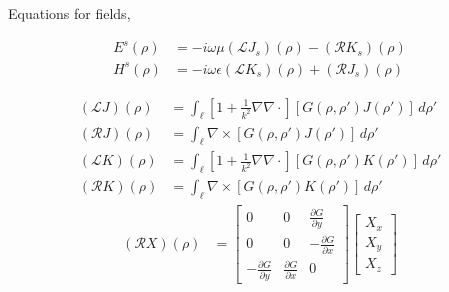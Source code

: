 \documentclass{article}
\newcommand{\0}{\varnothing}
\begin{document}
Equations for fields,

\begin{align*}
    E^s(\rho) &= -i\omega\mu(\mathcal{L}J_s)(\rho) - (\mathcal{R}K_s)(\rho)\\
    H^s(\rho) &= -i\omega\epsilon(\mathcal{L}K_s)(\rho) + (\mathcal{R}J_s)(\rho)
\end{align*}

\begin{align*}
    (\mathcal{L}J)(\rho) &= \int_{\ell}[1+\frac{1}{k^2}\nabla\nabla\cdotp] [G(\rho,\rho')J(\rho')] \,d\rho'\\
    (\mathcal{R}J)(\rho) &= \int_{\ell}\nabla \times [G(\rho,\rho')J(\rho')] \,d\rho'\\
    (\mathcal{L}K)(\rho) &= \int_{\ell}[1+\frac{1}{k^2}\nabla\nabla\cdotp] [G(\rho,\rho')K(\rho')] \,d\rho'\\
    (\mathcal{R}K)(\rho) &= \int_{\ell}\nabla \times [G(\rho,\rho')K(\rho')] \,d\rho'
\end{align*}
\begin{align*}
    (\mathcal{R}X)(\rho)
       &= \left[ \begin{array}{ccc} 0 & 0 & \frac{\partial G}{\partial y}\\ 
                            0 & 0 &-\frac{\partial G}{\partial x}\\ 
                            -\frac{\partial G}{\partial y} &\frac{\partial G}{\partial x} &0 \end{array} \right]
        \left[ \begin{array}{c} 
        X_x \\ X_y \\ X_z \end{array} \right]
\end{align*}
\end{document}
